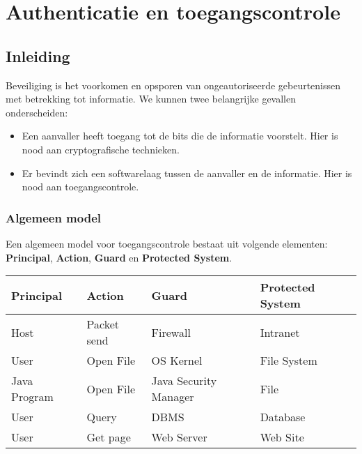 \documentclass[../main.tex]{subfiles}
\begin{document}
\chapter{Authenticatie en toegangscontrole}

\section{Inleiding}
Beveiliging is het voorkomen en opsporen van ongeautoriseerde gebeurtenissen met betrekking tot informatie. We kunnen twee belangrijke gevallen onderscheiden:
\begin{itemize}
	\item Een aanvaller heeft toegang tot de bits die de informatie voorstelt. Hier is nood aan cryptografische technieken.
	\item Er bevindt zich een softwarelaag tussen de aanvaller en de informatie. Hier is nood aan toegangscontrole.
\end{itemize}

\subsection{Algemeen model}
Een algemeen model voor toegangscontrole bestaat uit volgende elementen: \textbf{Principal}, \textbf{Action}, \textbf{Guard} en \textbf{Protected System}.

\begin{center}
\begin{tabular}{|l|l|l|l|}
\hline
\textbf{Principal} & \textbf{Action} & \textbf{Guard} & \textbf{Protected System} \\
\hline
Host & Packet send & Firewall & Intranet \\
\hline
User & Open File & OS Kernel & File System \\
\hline
Java Program & Open File & Java Security Manager & File \\
\hline
User & Query & DBMS & Database \\
\hline
User & Get page & Web Server  & Web Site \\
\hline
\end{tabular}
\end{center}
\end{document}
